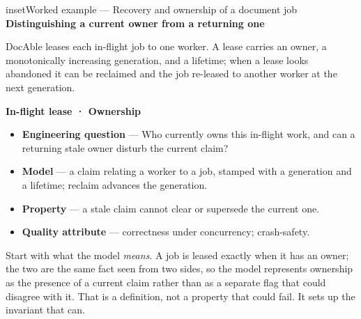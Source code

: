 \begin{bookbox}{inset}{Worked example --- Recovery and ownership of a document job}
\textbf{Distinguishing a current owner from a returning one}

DocAble leases each in-flight job to one worker. A lease carries an owner, a monotonically increasing generation, and a lifetime; when a lease looks abandoned it can be reclaimed and the job re-leased to another worker at the next generation.

\textbf{In-flight lease · Ownership}

\begin{itemize}
\tightlist
\item
  \textbf{Engineering question} --- Who currently owns this in-flight work, and can a returning stale owner disturb the current claim?
\end{itemize}



\begin{itemize}
\tightlist
\item
  \textbf{Model} --- a claim relating a worker to a job, stamped with a generation and a lifetime; reclaim advances the generation.
\end{itemize}



\begin{itemize}
\tightlist
\item
  \textbf{Property} --- a stale claim cannot clear or supersede the current one.
\end{itemize}



\begin{itemize}
\tightlist
\item
  \textbf{Quality attribute} --- correctness under concurrency; crash-safety.
\end{itemize}


Start with what the model \emph{means}. A job is leased exactly when it has an owner; the two are the same fact seen from two sides, so the model represents ownership as the presence of a current claim rather than as a separate flag that could disagree with it. That is a definition, not a property that could fail. It sets up the invariant that can.



\end{bookbox}
